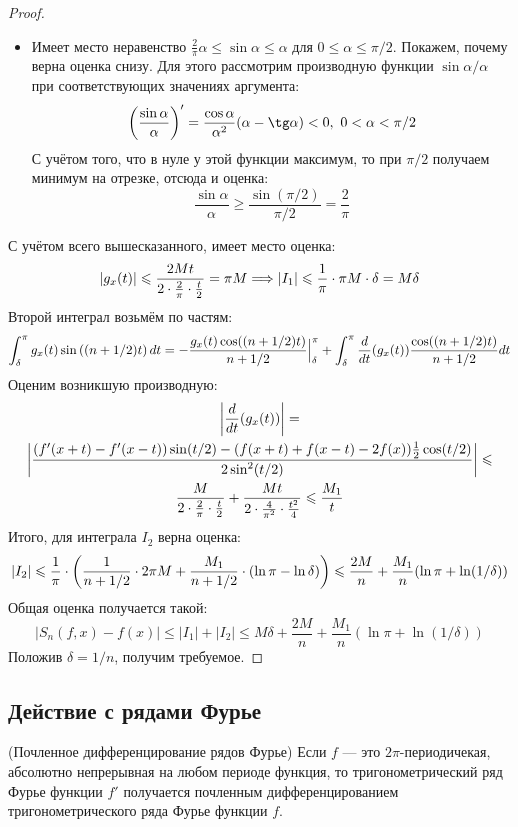 \begin{proof}
\begin{itemize}
		\item Имеет место неравенство $\frac{2}{\pi}\alpha \le \sin \alpha \le \alpha$ для $0 \le \alpha \le \pi / 2$. Покажем, почему верна оценка снизу. Для этого рассмотрим производную функции $\sin \alpha / \alpha$ при соответствующих значениях аргумента:
		\[
			\ps{\frac{\sin \alpha}{\alpha}}' = \frac{\cos \alpha}{\alpha^2}(\alpha - \tg \alpha) < 0,\ 0 < \alpha < \pi / 2
		\]
		С учётом того, что в нуле у этой функции максимум, то при $\pi / 2$ получаем минимум на отрезке, отсюда и оценка:
		\[
			\frac{\sin \alpha}{\alpha} \ge \frac{\sin(\pi / 2)}{\pi / 2} = \frac{2}{\pi}
		\]
	\end{itemize}
 	С учётом всего вышесказанного, имеет место оценка:
 	\[
 		|g_x(t)| \leqslant \frac{2Mt}{2 \cdot \frac{2}{\pi} \cdot \frac{t}{2}} = \pi M \Longrightarrow |I_1| \leqslant \frac{1}{\pi} \cdot \pi M \cdot \delta = M\delta
 	\]
 	Второй интеграл возьмём по частям:
 	\[
 		\int_\delta^\pi g_x(t)\sin\left((n + 1 / 2)t\right)dt = -\frac{g_x(t)\cos((n + 1 / 2)t)}{n + 1 / 2}\Big|_\delta^\pi + \int_\delta^\pi \frac{d}{dt}(g_x(t)) \frac{\cos((n + 1 / 2)t)}{n + 1 / 2}dt
 	\]
 	Оценим возникшую производную:
 	\begin{multline*}
 		\left|\frac{d}{dt}(g_x(t))\right| =
 		\\
 		\left|\frac{(f'(x + t) - f'(x - t))\sin(t / 2) - (f(x + t) + f(x - t) - 2f(x))\frac{1}{2}\cos(t / 2)}{2\sin^2(t / 2)}\right| \leqslant
 		\\
 		\frac{M}{2 \cdot \frac{2}{\pi} \cdot \frac{t}{2}} + \frac{Mt}{2 \cdot \frac{4}{\pi^2} \cdot \frac{t^2}{4}} \leqslant \frac{M_1}{t}
 	\end{multline*}
 	Итого, для интеграла $I_2$ верна оценка:
 	\[
 		|I_2| \leqslant \frac{1}{\pi} \cdot \left(\frac{1}{n + 1 / 2} \cdot 2\pi M + \frac{M_1}{n + 1 / 2} \cdot (\ln \pi - \ln \delta)\right) \leqslant \frac{2M}{n} + \frac{M_1}{n}(\ln \pi + \ln(1 / \delta))
 	\]
 	Общая оценка получается такой:
 	\[
 		|S_n(f, x) - f(x)| \le |I_1| + |I_2| \le M\delta  + \frac{2M}{n} + \frac{M_1}{n}(\ln \pi + \ln(1 / \delta))
 	\]
 	Положив $\delta = 1 / n$, получим требуемое.
\end{proof}

\subsection{Действие с рядами Фурье}

\begin{theorem} (Почленное дифференцирование рядов Фурье) Если $f$ --- это $2\pi$-периодичекая, абсолютно непрерывная на любом периоде функция, то тригонометрический ряд Фурье функции $f'$ получается почленным дифференцированием тригонометрического ряда Фурье функции $f$.
\end{theorem}

